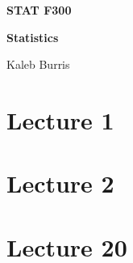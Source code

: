 \documentclass[12pt, letterpaper]{book}
\begin{document}
    \begin{titlepage}
        \Huge \textbf{STAT F300}

        \huge \textbf{Statistics}

        \vfill

        \Large Kaleb Burris
    \end{titlepage}

    \section*{Lecture 1}
    
    

    \pagebreak
    
    \section*{Lecture 2}

    

    \section*{Lecture 20}

    
\end{document}
